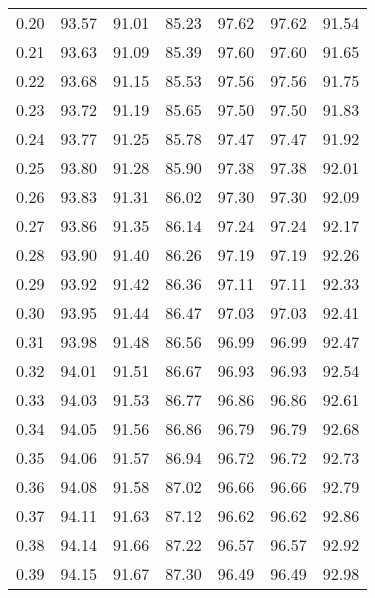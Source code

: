 \begin{tabular}{|c|c|c|c|c|c|c|}
      0.20 &     93.57 &     91.01 &      85.23 &   97.62 &      97.62 &         91.54 \\
      0.21 &     93.63 &     91.09 &      85.39 &   97.60 &      97.60 &         91.65 \\
      0.22 &     93.68 &     91.15 &      85.53 &   97.56 &      97.56 &         91.75 \\
      0.23 &     93.72 &     91.19 &      85.65 &   97.50 &      97.50 &         91.83 \\
      0.24 &     93.77 &     91.25 &      85.78 &   97.47 &      97.47 &         91.92 \\
      0.25 &     93.80 &     91.28 &      85.90 &   97.38 &      97.38 &         92.01 \\
      0.26 &     93.83 &     91.31 &      86.02 &   97.30 &      97.30 &         92.09 \\
      0.27 &     93.86 &     91.35 &      86.14 &   97.24 &      97.24 &         92.17 \\
      0.28 &     93.90 &     91.40 &      86.26 &   97.19 &      97.19 &         92.26 \\
      0.29 &     93.92 &     91.42 &      86.36 &   97.11 &      97.11 &         92.33 \\
      0.30 &     93.95 &     91.44 &      86.47 &   97.03 &      97.03 &         92.41 \\
      0.31 &     93.98 &     91.48 &      86.56 &   96.99 &      96.99 &         92.47 \\
      0.32 &     94.01 &     91.51 &      86.67 &   96.93 &      96.93 &         92.54 \\
      0.33 &     94.03 &     91.53 &      86.77 &   96.86 &      96.86 &         92.61 \\
      0.34 &     94.05 &     91.56 &      86.86 &   96.79 &      96.79 &         92.68 \\
      0.35 &     94.06 &     91.57 &      86.94 &   96.72 &      96.72 &         92.73 \\
      0.36 &     94.08 &     91.58 &      87.02 &   96.66 &      96.66 &         92.79 \\
      0.37 &     94.11 &     91.63 &      87.12 &   96.62 &      96.62 &         92.86 \\
      0.38 &     94.14 &     91.66 &      87.22 &   96.57 &      96.57 &         92.92 \\
      0.39 &     94.15 &     91.67 &      87.30 &   96.49 &      96.49 &         92.98 \\

\end{tabular}
